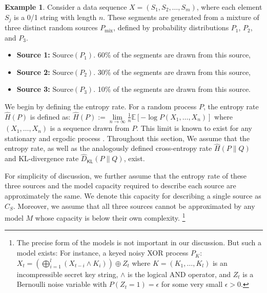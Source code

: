 \documentclass[11pt]{article}
\theoremstyle{plain}
\theoremstyle{definition}
\newtheorem{example}[theorem]{Example}
\newcommand{\entropyrate}{\hat{H}}
\newcommand{\KLrate}{\hat{D}_{\mathsf{KL}}}
\begin{document}


\begin{example}
Consider a data sequence \(X = (S_1, S_2, \dots, S_m)\), where each element \(S_j\) is a 0/1 string with length $n$. These segments are generated from a mixture of three distinct random sources $P_{\text{mix}}$, defined by probability distributions \(P_1\), \(P_2\), and \(P_3\).
\begin{itemize}
    \item \textbf{Source 1:} \(\text{Source}(P_1)\). 60\% of the segments are drawn from this source,
    \item \textbf{Source 2:} \(\text{Source}(P_2)\). 30\% of the segments are drawn from this source,
    \item \textbf{Source 3:} \(\text{Source}(P_3)\). 10\% of the segments are drawn from this source.
\end{itemize}
We begin by defining the entropy rate. For a random process $P$, the entropy rate $\entropyrate(P)$ is defined as:
$ \entropyrate(P) := \lim\limits_{n \to \infty} \frac{1}{n} \mathbb{E}[-\log P(X_1, \dots, X_n)] $
where $(X_1, \dots, X_n)$ is a sequence drawn from $P$. This limit is known to exist for any stationary and ergodic process \citep{cover2006elements}. 
Throughout this section,
We assume that the entropy rate, as well as the analogously defined cross-entropy rate $\entropyrate(P\|Q)$ and KL-divergence rate $\KLrate(P\|Q)$, exist.

For simplicity of discussion, we further assume that the entropy rate of these three sources and the model capacity required to describe each source are approximately the same. We denote this capacity for describing a single source as \(C_S\). 
Moreover, we assume that all three sources cannot be approximated by any model $M$ whose capacity is below their own complexity.
\footnote{
The precise form of the models is not important 
in our discussion. But such a model exists:
For instance, a keyed noisy XOR process $P_K$:
$
X_t = \left( \bigoplus_{i=1}^l (X_{t-i} \land K_i) \right) \oplus Z_t
$
where $K = (K_1, \dots, K_l)$ is an incompressible secret key string, $\land$ is the logical AND operator, and \(Z_t\) is a Bernoulli noise variable with \(P(Z_t=1) = \epsilon\) for some very small \(\epsilon > 0\). 
}


\end{example}
\end{document}
